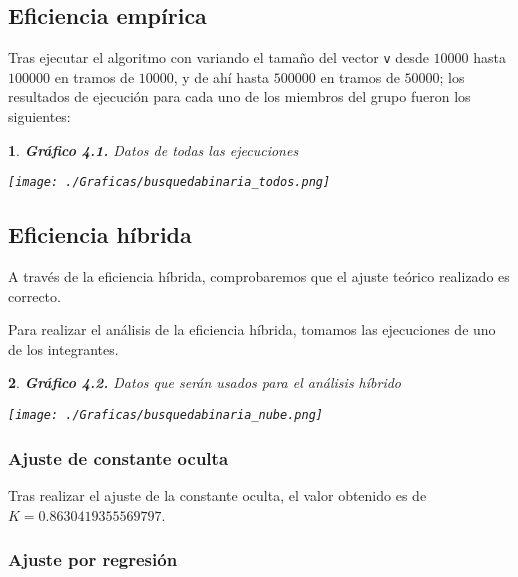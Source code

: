 \documentclass[10pt, a4paper]{article}
\theoremstyle{theorem-style}
\newtheorem*{datos}{}
\theoremstyle{theorem-style}
\theoremstyle{definition-style}
\theoremstyle{remark-style}
\theoremstyle{example-style}
\theoremstyle{definition-style}
\theoremstyle{remark-style}
\begin{document}
\subsection{Eficiencia empírica}

Tras ejecutar el algoritmo con variando el tamaño del vector \texttt{v} desde $10000$ hasta $100000$ en tramos de $10000$, y de ahí hasta $500000$ en tramos de $50000$; los resultados de ejecución para cada uno de los miembros del grupo fueron los siguientes:

\begin{datos}\hspace{-0.2cm}
	{\bf\sffamily Gráfico 4.1.} {\sffamily Datos de todas las ejecuciones}\\
	\vspace{-0.7cm}
	\begin{center}
		\texttt{[image: ./Graficas/busquedabinaria\_todos.png]}
	\end{center}
\end{datos}

\subsection{Eficiencia híbrida}

A través de la eficiencia híbrida, comprobaremos que el ajuste teórico realizado es correcto.

Para realizar el análisis de la eficiencia híbrida, tomamos las ejecuciones de uno de los integrantes.
\pagebreak
\begin{datos}
	{\bf\sffamily Gráfico 4.2.} {\sffamily Datos que serán usados para el análisis híbrido}\\
	\vspace{-0.7cm}
	\begin{center}
		\texttt{[image: ./Graficas/busquedabinaria\_nube.png]}
	\end{center}	
\end{datos}

\subsubsection{Ajuste de constante oculta}

Tras realizar el ajuste de la constante oculta, el valor obtenido es de $K=0.8630419355569797$.

\subsubsection{Ajuste por regresión}
\end{document}
